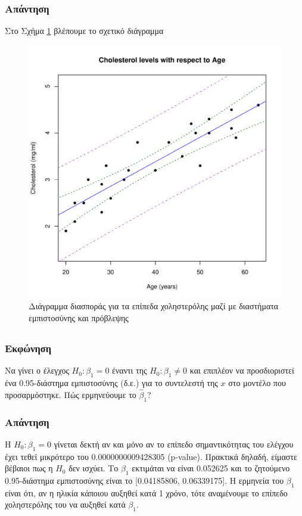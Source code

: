\documentclass{article}
\newcommand{\hb}{\hat{\beta}}
\begin{document}
\subsubsection*{Απάντηση}
Στο Σχήμα \ref{fig:part-b-scatter} βλέπουμε το σχετικό διάγραμμα 
\begin{figure}[h]
    \centering
    \includegraphics[width=1.0\textwidth]{part-b-scatter.pdf}
    \caption{Διάγραμμα διασποράς για τα επίπεδα χοληστερόλης μαζί με διαστήματα εμπιστοσύνης και πρόβλεψης}
    \label{fig:part-b-scatter}
\end{figure}

\subsection{}
\subsubsection*{Εκφώνηση}
Να γίνει ο έλεγχος \(H_0: \beta_1 = 0\) έναντι της \(H_0: \beta_1 \neq 0\) και επιπλέον να προσδιοριστεί
ένα 0.95-διάστημα εμπιστοσύνης (δ.ε.) για το συντελεστή της \(x\) στο μοντέλο που
προσαρμόστηκε. Πώς ερμηνεύουμε το \(\hb_1\)?
\subsubsection*{Απάντηση}
Η \(H_0: \beta_1 = 0\) γίνεται δεκτή αν και μόνο αν το επίπεδο σημαντικότητας του ελέγχου έχει τεθεί μικρότερο του 0.0000000009428305 (\textlatin{p-value}).
Πρακτικά δηλαδή, είμαστε βέβαιοι πως η \(H_0\) δεν ισχύει.
Το \(\beta_1\) εκτιμάται να είναι 0.052625 και το ζητούμενο 0.95-διάστημα εμπιστοσύνης είναι το [0.04185806, 0.06339175].
Η ερμηνεία του \(\beta_1\) είναι ότι, αν η ηλικία κάποιου αυξηθεί κατά 1 χρόνο,
τότε αναμένουμε το επίπεδο χοληστερόλης του να αυξηθεί κατά \(\beta_1\).
\end{document}
